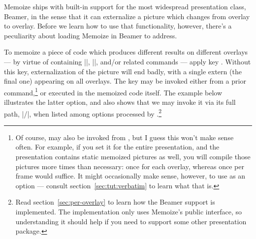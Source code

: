 \documentclass[a4paper,11pt]{article}
\begin{document}
Memoize ships with built-in support for the most widespread 
presentation class, Beamer, in the sense that it can externalize a picture
which changes from overlay to overlay.  Before we learn how to use that
functionality, however, there's a peculiarity about loading Memoize in Beamer
to address.



To memoize a piece of code which produces different results on different
overlays --- by virtue of containing |\pause|, |\only|, and\slash or related
commands --- apply key .  Without this key,
externalization of the picture will end badly, with a single extern (the final
one) appearing on all overlays.  The key may be invoked either from a prior
 command,\footnote{Of course,  may also be
  invoked from , but I guess this won't make sense often.  For
  example, if you set it for the entire presentation, and the presentation
  contains static memoized pictures as well, you will compile those pictures
  more times than necessary: once for each overlay, whereas once per frame
  would suffice.  It might occasionally make sense, however, to use  as an  option --- consult
  section~\ref{sec:tut:verbatim} to learn what that is.}  or executed in the
memoized code itself.  The example below illustrates the latter option, and
also shows that we may invoke it via its full path,
|/|, when listed among options processed by
.\footnote{Read section~\ref{sec:per-overlay} to learn how the
  Beamer support is implemented.  The implementation only uses Memoize's public
  interface, so understanding it should help if you need to support some other
  presentation package.}

\end{document}
